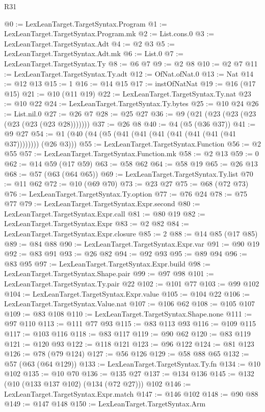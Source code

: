 \begin{lexlean}{R31}
\begin{coremodule}
@0 := LexLeanTarget.TargetSyntax.Program
@1 := LexLeanTarget.TargetSyntax.Program.mk
@2 := List.cons.{0}
@3 := LexLeanTarget.TargetSyntax.Adt
@4 := @2 @3
@5 := LexLeanTarget.TargetSyntax.Adt.mk
@6 := List.{0}
@7 := LexLeanTarget.TargetSyntax.Ty
@8 := @6 @7
@9 := @2 @8
@10 := @2 @7
@11 := LexLeanTarget.TargetSyntax.Ty.adt
@12 := OfNat.ofNat.{0}
@13 := Nat
@14 := @12 @13
@15 := 1
@16 := @14 @15
@17 := instOfNatNat
@19 := @16 (@17 @15)
@21 := @10 (@11 @19)
@22 := LexLeanTarget.TargetSyntax.Ty.nat
@23 := @10 @22
@24 := LexLeanTarget.TargetSyntax.Ty.bytes
@25 := @10 @24
@26 := List.nil.{0}
@27 := @26 @7
@28 := @25 @27
@36 := @9 (@21 (@23 (@23 (@23 (@23 (@23 (@23 @28)))))))
@37 := @26 @8
@40 := @4 (@5 (@36 @37))
@41 := @9 @27
@54 := @1 (@40 (@4 (@5 (@41 (@41 (@41 (@41 (@41 (@41 (@41 @37)))))))) (@26 @3)))
@55 := LexLeanTarget.TargetSyntax.Function
@56 := @2 @55
@57 := LexLeanTarget.TargetSyntax.Function.mk
@58 := @2 @13
@59 := 0
@62 := @14 @59 (@17 @59)
@63 := @58 @62
@64 := @58 @19
@65 := @26 @13
@68 := @57 (@63 (@64 @65))
@69 := LexLeanTarget.TargetSyntax.Ty.list
@70 := @11 @62
@72 := @10 (@69 @70)
@73 := @23 @27
@75 := @68 (@72 @73)
@76 := LexLeanTarget.TargetSyntax.Ty.option
@77 := @76 @24
@78 := @75 @77
@79 := LexLeanTarget.TargetSyntax.Expr.second
@80 := LexLeanTarget.TargetSyntax.Expr.call
@81 := @80 @19
@82 := LexLeanTarget.TargetSyntax.Expr
@83 := @2 @82
@84 := LexLeanTarget.TargetSyntax.Expr.closure
@85 := 2
@88 := @14 @85 (@17 @85)
@89 := @84 @88
@90 := LexLeanTarget.TargetSyntax.Expr.var
@91 := @90 @19
@92 := @83 @91
@93 := @26 @82
@94 := @92 @93
@95 := @89 @94
@96 := @83 @95
@97 := LexLeanTarget.TargetSyntax.Expr.build
@98 := LexLeanTarget.TargetSyntax.Shape.pair
@99 := @97 @98
@101 := LexLeanTarget.TargetSyntax.Ty.pair @22
@102 := @101 @77
@103 := @99 @102
@104 := LexLeanTarget.TargetSyntax.Expr.value
@105 := @104 @22
@106 := LexLeanTarget.TargetSyntax.Value.nat
@107 := @106 @62
@108 := @105 @107
@109 := @83 @108
@110 := LexLeanTarget.TargetSyntax.Shape.none
@111 := @97 @110
@113 := @111 @77 @93
@115 := @83 @113 @93
@116 := @109 @115
@117 := @103 @116
@118 := @83 @117
@119 := @90 @62
@120 := @83 @119
@121 := @120 @93
@122 := @118 @121
@123 := @96 @122
@124 := @81 @123
@126 := @78 (@79 @124)
@127 := @56 @126
@129 := @58 @88 @65
@132 := @57 (@63 (@64 @129))
@133 := LexLeanTarget.TargetSyntax.Ty.fn
@134 := @10 @102
@135 := @10 @70
@136 := @135 @27
@137 := @134 @136
@145 := @132 (@10 (@133 @137 @102) (@134 (@72 @27))) @102
@146 := LexLeanTarget.TargetSyntax.Expr.match
@147 := @146 @102
@148 := @90 @88
@149 := @147 @148
@150 := LexLeanTarget.TargetSyntax.Arm

\end{coremodule}
\end{lexlean}
